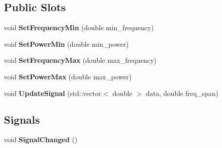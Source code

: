 \subsection*{Public Slots}
\begin{DoxyCompactItemize}
\item 
void {\bfseries Set\+Frequency\+Min} (double min\+\_\+frequency)\hypertarget{class_instrument_view_ab91cbc99522a6045249bffacefd41514}{}\label{class_instrument_view_ab91cbc99522a6045249bffacefd41514}

\item 
void {\bfseries Set\+Power\+Min} (double min\+\_\+power)\hypertarget{class_instrument_view_a799847cc22b7e60d9fad7786b43e1b38}{}\label{class_instrument_view_a799847cc22b7e60d9fad7786b43e1b38}

\item 
void {\bfseries Set\+Frequency\+Max} (double max\+\_\+frequency)\hypertarget{class_instrument_view_a4e0fa885d57a9588bda4373bcb2568c3}{}\label{class_instrument_view_a4e0fa885d57a9588bda4373bcb2568c3}

\item 
void {\bfseries Set\+Power\+Max} (double max\+\_\+power)\hypertarget{class_instrument_view_ab8479bd6bc1690b687e6edafb8470cb3}{}\label{class_instrument_view_ab8479bd6bc1690b687e6edafb8470cb3}

\item 
void {\bfseries Update\+Signal} (std\+::vector$<$ double $>$ data, double freq\+\_\+span)\hypertarget{class_instrument_view_aeedb3cab5a13eef6127b73976f50c584}{}\label{class_instrument_view_aeedb3cab5a13eef6127b73976f50c584}

\end{DoxyCompactItemize}
\subsection*{Signals}
\begin{DoxyCompactItemize}
\item 
void {\bfseries Signal\+Changed} ()\hypertarget{class_instrument_view_a34307a11aea62e2bde7b56b44d118193}{}\label{class_instrument_view_a34307a11aea62e2bde7b56b44d118193}

\end{DoxyCompactItemize}
